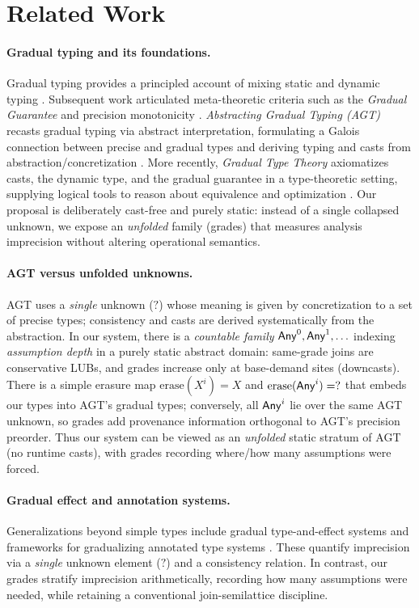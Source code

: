 \section{Related Work}
\label{sec:related}

\paragraph{Gradual typing and its foundations.}
Gradual typing provides a principled account of mixing static and dynamic typing \cite{SiekTaha2006}. Subsequent work articulated meta-theoretic criteria such as the \emph{Gradual Guarantee} and precision monotonicity \cite{SiekGarciaTaha2015}. \emph{Abstracting Gradual Typing (AGT)} recasts gradual typing via abstract interpretation, formulating a Galois connection between precise and gradual types and deriving typing and casts from abstraction/concretization \cite{GarciaClarkTanter2016}. More recently, \emph{Gradual Type Theory} axiomatizes casts, the dynamic type, and the gradual guarantee in a type-theoretic setting, supplying logical tools to reason about equivalence and optimization \cite{NewLicataAhmed2021}. Our proposal is deliberately cast-free and purely static: instead of a single collapsed unknown, we expose an \emph{unfolded} family (grades) that measures analysis imprecision without altering operational semantics.

\paragraph{AGT versus unfolded unknowns.}
AGT uses a \emph{single} unknown ($?$) whose meaning is given by concretization to a set of precise types; consistency and casts are derived systematically from the abstraction. In our system, there is a \emph{countable family} $\mathsf{Any}^{0},\mathsf{Any}^{1},\ldots$ indexing \emph{assumption depth} in a purely static abstract domain: same-grade joins are conservative LUBs, and grades increase only at base-demand sites (downcasts). There is a simple erasure map $\mathrm{erase}(X^{i})=X$ and $\mathrm{erase}(\mathsf{Any}^{i})=?$ that embeds our types into AGT’s gradual types; conversely, all $\mathsf{Any}^{i}$ lie over the same AGT unknown, so grades add provenance information orthogonal to AGT’s precision preorder. Thus our system can be viewed as an \emph{unfolded} static stratum of AGT (no runtime casts), with grades recording where/how many assumptions were forced.

\paragraph{Gradual effect and annotation systems.}
Generalizations beyond simple types include gradual type-and-effect systems \cite{BanadosSchwerterGarciaTanter2016} and frameworks for gradualizing annotated type systems \cite{ThiemannFennell2014}. These quantify imprecision via a \emph{single} unknown element ($?$) and a consistency relation. In contrast, our grades stratify imprecision arithmetically, recording how many assumptions were needed, while retaining a conventional join-semilattice discipline.

